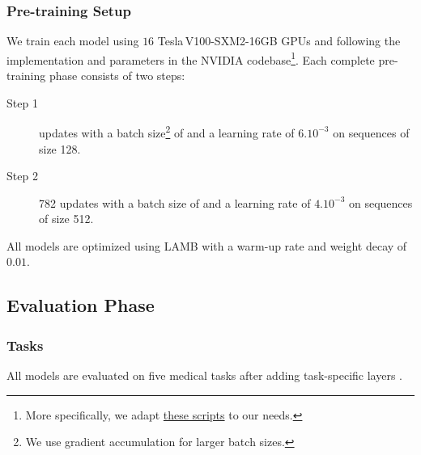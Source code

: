 \documentclass[11pt]{article}
\begin{document}
\subsubsection{Pre-training Setup}\label{sec:pretrainingSetup}

We train each model using $16$ Tesla\,V100-SXM2-16GB GPUs and following the implementation and parameters in the NVIDIA codebase\footnote{More specifically, we adapt \href{https://github.com/NVIDIA/DeepLearningExamples/tree/master/PyTorch/LanguageModeling/BERT}{these scripts} to our needs.}. Each complete pre-training phase consists of two steps:

\begin{description}
    \item[Step 1]  updates with a batch size\footnote{We use gradient accumulation for larger batch sizes.} of  and a learning rate of $6.10^{-3}$ on sequences of size 128.
    \item[Step 2] 782 updates with a batch size of  and a learning rate of $4.10^{-3}$ on sequences of size 512.
\end{description}

\noindent All models are optimized using LAMB \cite{you2019large} with a warm-up rate and weight decay of $0.01$.

\subsection{Evaluation Phase}
\subsubsection{Tasks}
All models are evaluated on five medical tasks after adding task-specific layers \cite{devlin-etal-2019-bert}.
\end{document}
